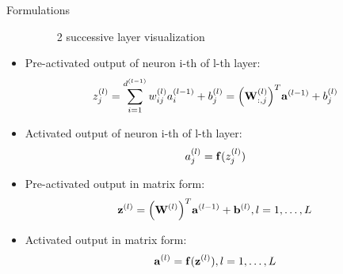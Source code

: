 \documentclass[10pt]{beamer}
\theoremstyle{remark}
\theoremstyle{definition}
\begin{document}
\begin{frame}[allowframebreaks]{Formulations}
\begin{itemize}
\begin{figure}
{
			}
			\caption{2 successive layer visualization}
		\end{figure}
		\item Pre-activated output of neuron i-th of l-th layer:
		\begin{equation}
			z_j^{(l)}=\sum_{i=1}^{d^{(l-1)}}w_{ij}^{(l)}a_i^{(l-1)}+b_j^{(l)}=\Big(\bold{W}_{:,j}^{(l)}\Big)^T \bold{a}^{(l-1)} + b_j^{(l)}
		\end{equation}
		\item Activated output of neuron i-th of l-th layer:
		\begin{equation}
			a_j^{(l)} = \bold{f}(z_j^{(l)})
		\end{equation}
		\item Pre-activated output in matrix form:
		\begin{equation}
			\bold{z}^{(l)}=\Big(\bold{W}^{(l)}\Big)^T\bold{a}^{(l-1)} + \bold{b}^{(l)}, l=1, \dots, L
		\end{equation}
		\item Activated output in matrix form:
		\begin{equation}
			\bold{a}^{(l)}=\bold{f}(\bold{z}^{(l)}), l=1, \dots, L
		\end{equation}
		\begin{figure}
			\centering
			\resizebox{8.0cm}{!}{
				\begin{tikzpicture}
	

\end{tikzpicture}}
\end{figure}
\end{itemize}
\end{frame}
\end{document}
